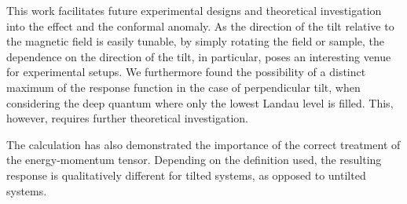 This work facilitates future experimental designs and theoretical investigation into the effect and the conformal anomaly.
As the direction of the tilt relative to the magnetic field is easily tunable, by simply rotating the field or sample, the dependence on the direction of the tilt, in particular, poses an interesting venue for experimental setups.
We furthermore found the possibility of a distinct maximum of the response function in the case of perpendicular tilt, when considering the deep quantum where only the lowest Landau level is filled.
This, however, requires further theoretical investigation.



The calculation has also demonstrated the importance of the correct treatment of the energy-momentum tensor.
Depending on the definition used, the resulting response is qualitatively different for tilted systems, as opposed to untilted systems.%

